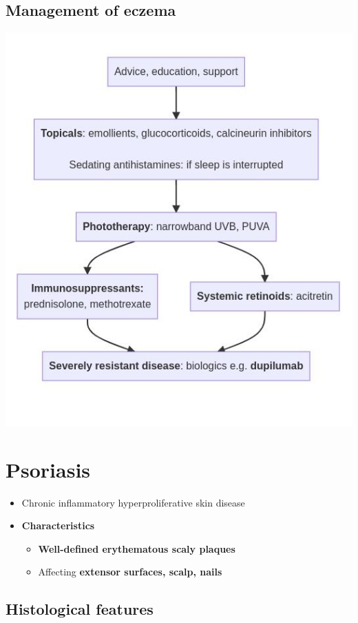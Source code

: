 \documentclass[
  12pt,
]{memoir}
\providecommand{\tightlist}{%
  \setlength{\itemsep}{0pt}\setlength{\parskip}{0pt}}
\begin{document}
\hypertarget{management-of-eczema}{%
\subsection{Management of eczema}\label{management-of-eczema}}

\includegraphics[width=.8\textwidth]{../assets/eczema.jpg}

\pagebreak

\hypertarget{psoriasis}{%
\section{Psoriasis}\label{psoriasis}}

\begin{itemize}
\tightlist
\item
  Chronic inflammatory hyperproliferative skin disease
\item
  \textbf{Characteristics}

  \begin{itemize}
  \tightlist
  \item
    \textbf{Well-defined erythematous scaly plaques}
  \item
    Affecting \textbf{extensor surfaces, scalp, nails}
  \end{itemize}
\end{itemize}

\hypertarget{histological-features}{%
\subsection{Histological features}\label{histological-features}}
\end{document}
